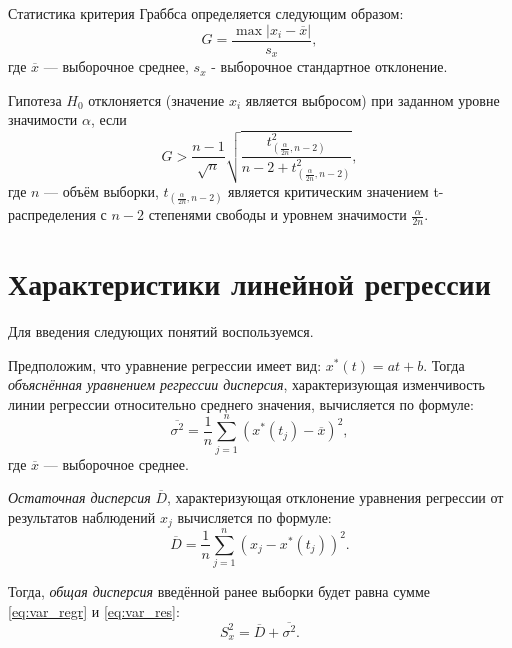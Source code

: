 Статистика критерия Граббса определяется следующим образом:
\begin{equation*}
	G = \frac{\max \vert x_i - \overline{x} \vert}{s_x},
\end{equation*}
где $\overline{x}$ --- выборочное среднее, $s_x$ - выборочное стандартное отклонение.

Гипотеза $H_0$ отклоняется (значение $x_i$ является выбросом) при заданном уровне значимости $\alpha$, если
\begin{equation*}
	G > \frac{n-1}{\sqrt{n}} \sqrt{\frac{t_{\left( \frac{\alpha}{2n}, n - 2 \right)}^2}{n - 2 + t_{\left( \frac{\alpha}{2n}, n - 2 \right)}^2}},
\end{equation*}
где $n$ --- объём выборки, $t_{\left( \frac{\alpha }{2n}, n - 2 \right)}$ является критическим значением t-распределения с $n - 2$ степенями свободы и уровнем значимости $\frac{\alpha}{2n}$.


\section*{Характеристики линейной регрессии} %
\label{sec:chars_regr}

Для введения следующих понятий воспользуемся.

Предположим, что уравнение регрессии имеет вид: $x^{*}(t) = at + b$. Тогда \textit{объяснённая уравнением регрессии дисперсия}, характеризующая изменчивость линии регрессии относительно среднего значения, вычисляется по формуле:
\begin{equation}
\label{eq:var_regr}
	\overline{\sigma^2} = \frac{1}{n} \sum_{j=1}^{n}{(x^{*}(t_j) - \overline{x})^2},
\end{equation}
где $\overline{x}$ --- выборочное среднее.

\textit{Остаточная дисперсия} $\overline{D}$, характеризующая отклонение уравнения регрессии от результатов наблюдений $x_j$ вычисляется по формуле:
\begin{equation}
\label{eq:var_res}
	\overline{D} = \frac{1}{n} \sum_{j=1}^{n}{(x_j - x^{*}(t_j))^2}.
\end{equation}

Тогда, \textit{общая дисперсия} введённой ранее выборки будет равна сумме \eqref{eq:var_regr} и \eqref{eq:var_res}:
\begin{equation*}
	S_x^2 = \overline{D} + \overline{\sigma^2}.
\end{equation*}

